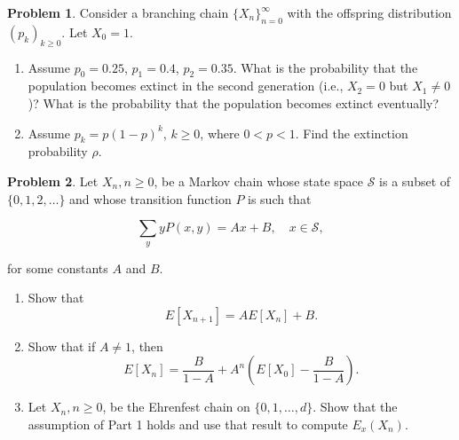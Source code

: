 \documentclass[12pt]{extreport}
\theoremstyle{definition}
\newtheorem{prob}{Problem}
\begin{document}
        \begin{prob}
Consider a branching chain $\{X_n\}_{n=0}^{\infty}$ with the offspring distribution $(p_k)_{k \geq 0}$. Let $X_0 = 1$.

\begin{enumerate}
    \item Assume $p_0 = 0.25$, $p_1 = 0.4$, $p_2 = 0.35$. What is the probability that the population becomes extinct in the second generation (i.e., $X_2 = 0$ but $X_1 \neq 0$)? What is the probability that the population becomes extinct eventually?
    
    \item Assume $p_k = p(1 - p)^k$, $k \geq 0$, where $0 < p < 1$. Find the extinction probability $\rho$.
\end{enumerate}
    \end{prob}

    \vspace{0.2cm}
    \begin{prob}
Let $X_n, n \geq 0$, be a Markov chain whose state space $\mathcal{S}$ is a subset of $\{0,1,2,\dots\}$ and whose transition function $P$ is such that

\[
\sum_y y P(x, y) = A x + B, \quad x \in \mathcal{S},
\]

for some constants $A$ and $B$.

\begin{enumerate}
    \item Show that 
    \[
    E [X_{n+1}] = A E [X_n] + B.
    \]
    
    \item Show that if $A \neq 1$, then
    \[
    E [X_n] = \frac{B}{1 - A} + A^n \left( E [X_0] - \frac{B}{1 - A} \right).
    \]
    
    \item Let $X_n, n \geq 0$, be the Ehrenfest chain on $\{0, 1, \dots, d\}$. Show that the assumption of Part 1 holds and use that result to compute $E_x(X_n)$.
\end{enumerate}
    \end{prob}
\end{document}
